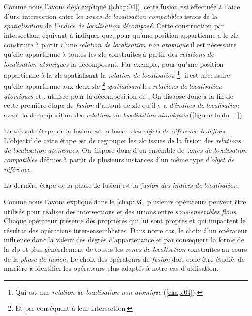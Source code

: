 Comme nous l'avons déjà expliqué (\autoref{chap:04}), cette fusion est
effectuée à l'aide d'une intersection entre les \emph{zones de
  localisation compatibles} issues de la \emph{spatialisation} de
\emph{l'indice de localisation décomposé.} Cette construction par
intersection, équivaut à indiquer que, pour qu'une position
appartienne a le \ac{zlc} construite à partir d'une \emph{relation de
  localisation non atomique} il est nécessaire qu'elle appartienne à
toutes les \ac{zlc} construites à partir des \emph{relations de
  localisation atomiques} la décomposant. Par exemple, pour qu'une
position appartienne à la \ac{zlc} spatialisant la \emph{relation de
  localisation}  \footnote{Qui est une
  \emph{relation de localisation non atomique} (\autoref{chap:04}).},
il est nécessaire qu'elle appartienne aux deux \ac{zlc} \footnote{Et
  par conséquent à leur intersection.} \emph{spatialisant} les
\emph{relations de localisation atomiques} 
et , utilisée pour la décomposition de
.
%
On dispose donc à la fin de cette première étape de \emph{fusion}
d'autant de \ac{zlc} qu'il y a \emph{d'indices de localisation} avant
la décomposition des \emph{relations de localisation atomiques}
(\autoref{fig:methodo_1}).

La seconde étape de la fusion est la fusion des \emph{objets de
  référence indéfinis.} L'objectif de cette étape est de regrouper les
\ac{zlc} issues de la fusion des \emph{relations de localisation
  atomiques.} On dispose donc d'un ensemble de \emph{zones de
  localisation compatibles} définies à partir de plusieurs instances
d'un même type \emph{d'objet de référence.}


La dernière étape de la phase de fusion est la \emph{fusion des
  indices de localisation.}



Comme nous l'avons expliqué dans le \autoref{chap:03}, plusieurs
opérateurs peuvent être utilisés pour réaliser des intersections et
des unions entre \emph{sous-ensembles flous.} Chaque opérateur
présente des propriétés qui lui sont propres et qui impactent le
résultat des opérations inter-ensemblistes. Dans notre cas, le choix
d'un opérateur influence donc la valeur des degrés d'appartenance et
par conséquent la forme de la \ac{zlp} et plus généralement de toutes
les \emph{zones de localisation} construites au cours de la
\emph{phase de fusion.} Le choix des opérateurs de \emph{fusion} doit
donc être étudié, de manière à identifier les opérateurs plus adaptés
à notre cas d'utilisation.

